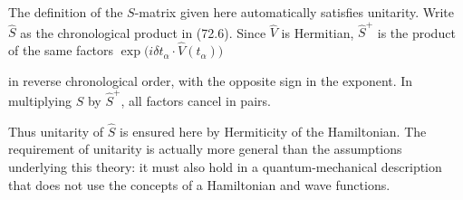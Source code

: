 The definition of the $S$-matrix given here automatically satisfies unitarity. Write $\hat S$ as the chronological product in (72.6). Since $\hat V$ is Hermitian, $\hat S^+$ is the product of the same factors $\exp\bigl(i\delta t_\alpha\cdot\hat V(t_\alpha)\bigr)$

in reverse chronological order, with the opposite sign in the exponent. In multiplying $\hat S$ by $\hat S^+$, all factors cancel in pairs.

Thus unitarity of $\hat S$ is ensured here by Hermiticity of the Hamiltonian. The requirement of unitarity is actually more general than the assumptions underlying this theory: it must also hold in a quantum-mechanical description that does not use the concepts of a Hamiltonian and wave functions.
